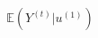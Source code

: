 \documentclass[preview]{standalone}
\begin{document}
\begin{align*}
\mathbb{E}(Y^{(t)} | u^{(1)})
\end{align*}
\end{document}
